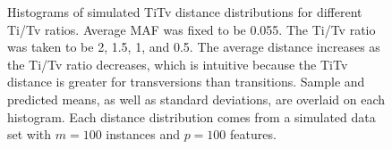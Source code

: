 \documentclass[10pt,letterpaper]{article}\usepackage[]{graphicx}\usepackage[]{color}
\begin{document}
\begin{figure}[H]
	\centering
	\caption{Histograms of simulated TiTv distance distributions for different Ti/Tv ratios. Average MAF was fixed to be 0.055. The Ti/Tv ratio was taken to be 2, 1.5, 1, and 0.5. The average distance increases as the Ti/Tv ratio decreases, which is intuitive because the TiTv distance is greater for transversions than transitions. Sample and predicted means, as well as standard deviations, are overlaid on each histogram. Each distance distribution comes from a simulated data set with $m=100$ instances and $p=100$ features.}\label{fig:TiTv_hist2}
\end{figure}


\end{document}
